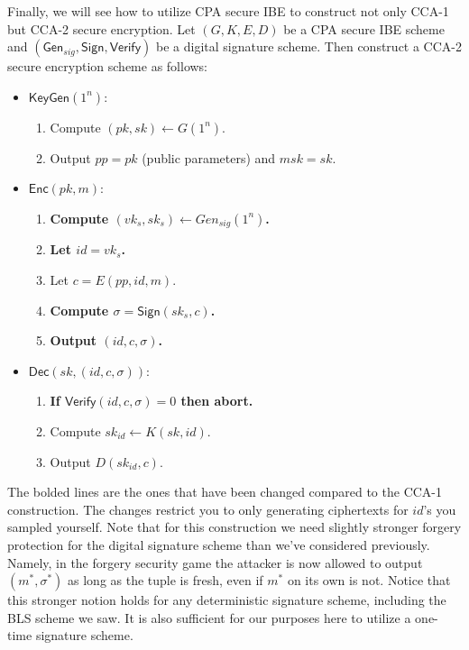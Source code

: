 Finally, we will see how to utilize CPA secure IBE to construct not only CCA-1 but CCA-2 secure encryption. 
Let $(G, K, E, D)$ be a CPA secure IBE scheme and $(\mathsf{Gen}_{sig}, \mathsf{Sign}, \mathsf{Verify})$ be a digital signature scheme. 
Then construct a CCA-2 secure encryption scheme as follows: 
\begin{itemize}
    \item $\mathsf{KeyGen}(1^n)$: 
    \begin{enumerate}
        \item Compute $(pk, sk) \leftarrow G(1^n)$. 
        
        \item Output $pp = pk$ (public parameters) and $msk = sk$. 
    \end{enumerate}

    \item $\mathsf{Enc}(pk, m)$: 
    \begin{enumerate}
        \item \textbf{Compute $(vk_s, sk_s) \leftarrow Gen_{sig}(1^n)$.}
        
        \item \textbf{Let $id = vk_s$.}

        \item Let $c = E(pp, id, m)$. 

        \item \textbf{Compute $\sigma = \mathsf{Sign}(sk_s, c)$.} 

        \item \textbf{Output $(id, c, \sigma)$.} 
    \end{enumerate}

    \item $\mathsf{Dec}(sk, (id,c,\sigma))$: 
    \begin{enumerate}
        \item \textbf{If $\mathsf{Verify}(id, c, \sigma) = 0$ then abort.} 

        \item Compute $sk_{id} \leftarrow K(sk, id)$. 

        \item Output $D(sk_{id}, c)$. 
    \end{enumerate}
\end{itemize}
The bolded lines are the ones that have been changed compared to the CCA-1 construction. 
The changes restrict you to only generating ciphertexts for $id$'s you sampled yourself. 
Note that for this construction we need slightly stronger forgery protection for the digital signature scheme than we've considered previously. 
Namely, in the forgery security game the attacker is now allowed to output $(m^*, \sigma^*)$ as long as the tuple is fresh, even if $m^*$ on its own is not. 
Notice that this stronger notion holds for any deterministic signature scheme, including the BLS scheme we saw. 
It is also sufficient for our purposes here to utilize a one-time signature scheme. 

